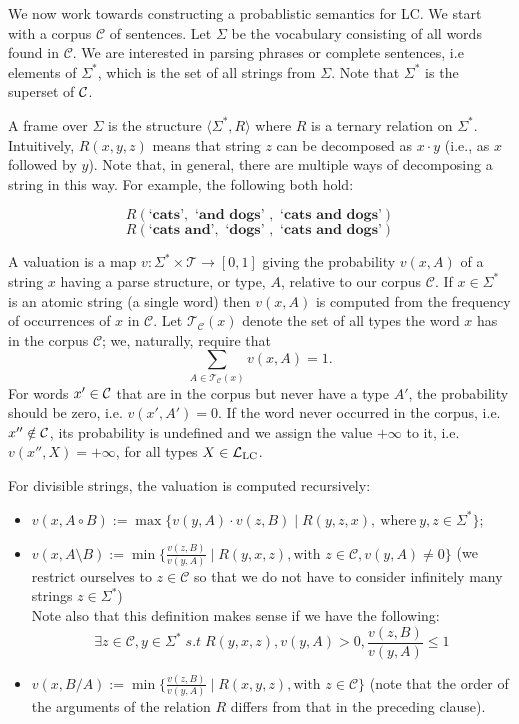\documentclass[11pt]{article}
\begin{document}
We now work towards constructing a probablistic semantics for LC. We start with a corpus $\mathcal{C}$ of sentences. Let $\Sigma$ be the vocabulary consisting of all words found in $\mathcal{C}$. We are interested in parsing phrases or complete sentences, i.e  elements of $\Sigma^*$, which is the set of all strings from $\Sigma$. Note that $\Sigma^*$ is the superset of ${\cal C}$. 

A frame over $\Sigma$ is the structure $\langle \Sigma^\ast, R \rangle$ where $R$ is a ternary relation on $\Sigma^\ast$. Intuitively, $R(x, y, z)$ means that string $z$ can be decomposed as $x \cdot y$ (i.e., as $x$ followed by $y$). Note that, in general, there are multiple ways of decomposing a string in this way. For example, the following both hold:

\[R(\textbf{`cats'}, \textbf{ `and dogs' }, \textbf{ `cats and dogs'})\]
\[R(\textbf{`cats and'}, \textbf{ `dogs' }, \textbf{ `cats and dogs'})\]

A valuation is a map $v \colon \Sigma^\ast \times \mathcal{T} \to [0,1]$ giving
the probability $v(x, A)$ of a string $x$ having a parse structure, or type,
$A$, relative to our corpus $\mathcal{C}$. If $x \in \Sigma^\ast$ is an atomic
string (a single word) then $v(x, A)$ is computed from the frequency of
occurrences of $x$ in $\mathcal{C}$.  Let $\mathcal{T}_{\mathcal{C}} (x)$ denote
the set of all types  the word $x$ has in the corpus $\mathcal{C}$; we,
naturally, require that
\begin{equation}
  \sum_{A \in \mathcal{T}_{\mathcal{C}} (x)} v(x,A) = 1.
\end{equation}
For words $x' \in {\cal C}$ that are in the corpus but never have a type $A'$, the probability should be zero, i.e. $v(x', A') = 0$. If the word never occurred in the corpus,  i.e. $x'' \notin {\cal C}$, its probability is undefined and we assign the value $+\infty$ to it, i.e. $v(x'', X) = +\infty$, for all types $X \in {\cal L}_{\text{LC}}$. 

For divisible strings, the valuation is computed recursively:
\begin{itemize}
    \item $v(x, A \circ B) := \max \{ v(y, A) \cdot v(z, B) \mid R(y, z, x), \ \text{where} \ y, z \in \Sigma^* \}$;
    \item $v(x, A \setminus B) := \min \{ \frac{v(z, B)}{v(y, A)} \mid R(y, x, z),
      \mbox{with $z \in \mathcal{C}$}, v(y, A) \neq 0 \}$ (we restrict ourselves to $z \in
      \mathcal{C}$ so that we do not have to consider infinitely many strings $z
      \in \Sigma^\ast$) \\ Note also that this definition makes sense if we have the following:
      \[\exists z \in \mathcal{C},  y \in \Sigma^* \; s.t \; R(y, x, z) , v(y, A) > 0, \frac{v(z, B)}{v(y, A)} \leq 1\]
    \item $v(x, B / A) := \min \{ \frac{v(z, B)}{v(y, A)} \mid R(x, y, z),
      \mbox{with $z \in \mathcal{C}$} \}$ (note that the order of the arguments
      of the relation $R$ differs from that in the preceding clause).
\end{itemize}
\end{document}
